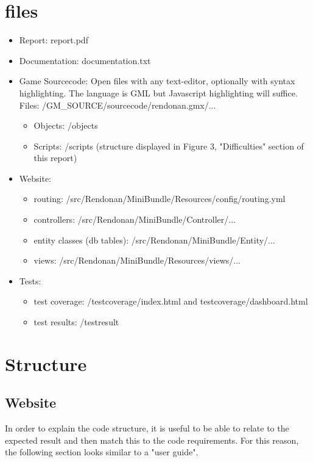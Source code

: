 \documentclass[12pt]{report}
\begin{document}
\section*{files}
\begin{itemize}
\item Report: report.pdf
\item Documentation: documentation.txt
\item Game Sourcecode: Open files with any text-editor, optionally with syntax highlighting. The language is GML but Javascript highlighting will suffice.
Files: /GM\_SOURCE/sourcecode/rendonan.gmx/...
\begin{itemize}
\item Objects: /objects
\item Scripts: /scripts (structure displayed in Figure 3, "Difficulties" section of this report)
\end{itemize}
\item Website:
\begin{itemize}
\item routing: /src/Rendonan/MiniBundle/Resources/config/routing.yml
\item controllers: /src/Rendonan/MiniBundle/Controller/...
\item entity classes (db tables): /src/Rendonan/MiniBundle/Entity/...
\item views: /src/Rendonan/MiniBundle/Resources/views/...
\end{itemize}
\item Tests:
\begin{itemize}
\item test coverage: /testcoverage/index.html and testcoverage/dashboard.html
\item test results: /testresult
\end{itemize}
\end{itemize}
\pagebreak

\section*{Structure}
\subsection*{Website}
In order to explain the code structure, it is useful to be able to relate to the expected result and then match this to the code requirements. For this reason, the following section looks similar to a "user guide".
\end{document}
